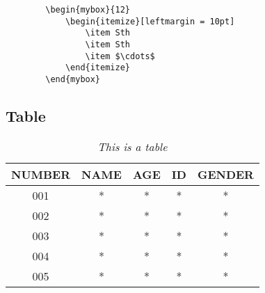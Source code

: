 \documentclass[a4paper, 12pt]{article}
\begin{document}
\begin{listing}[ht]
    \begin{verbatim}
        \begin{mybox}{12}
            \begin{itemize}[leftmargin = 10pt]
                \item Sth
                \item Sth
                \item $\cdots$
            \end{itemize}
        \end{mybox}
    \end{verbatim}
    \caption{\em mybox}
    \label{mybox}
\end{listing}

\clearpage
\subsection{Table}
\begin{table}[ht]
    \centering
    \begin{center}
        \caption{\em This is a table}
        \vskip 0.1in
        \label{table}
        \begin{tabular}{c|cccc}
          \hline
          \hline
          \rule{0pt}{3ex}
          NUMBER & NAME & AGE & ID & GENDER 
                                     \rule[-1.2ex]{0pt}{0pt} \\\hline
          001 & *  &  *  & *  & * \\ 
          002 & *  &  *  & *  & * \\
          003 & *  &  *  & *  & * \\      
          004 & *  &  *  & *  & * \\
          005 & *  &  *  & *  & * \\
          \hline
          \hline 
        \end{tabular}
    \end{center}
\end{table}
\end{document}
